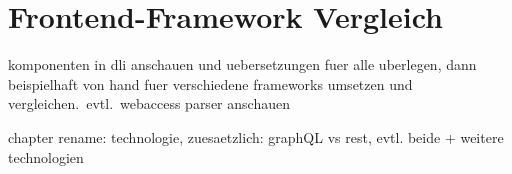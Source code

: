 \chapter{Frontend-Framework Vergleich}

komponenten in dli anschauen und uebersetzungen fuer alle uberlegen, dann beispielhaft von hand fuer verschiedene frameworks umsetzen und vergleichen.\ evtl.\ webaccess parser anschauen

chapter rename: technologie, zuesaetzlich: graphQL vs rest, evtl. beide + weitere technologien
